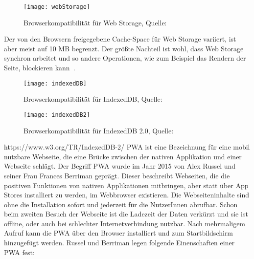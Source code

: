 \begin{figure}[H]
	\centering
	\texttt{[image: webStorage]}
	\grayRule
	\caption{Browserkompatibilität für Web Storage, Quelle: ~\cite{caniuse-ws}}
	\label{fig:webStorage}
\end{figure}
Der von den Browsern freigegebene Cache-Space für Web Storage variiert, ist aber meist auf 10 MB begrenzt. Der größte Nachteil ist wohl, dass Web Storage synchron arbeitet und so andere Operationen, wie zum Beispiel das Rendern der Seite, blockieren kann~\cite{webstorage-con}.
%
%
%
%
\begin{figure}[H]
	\centering
	\texttt{[image: indexedDB]}
	\grayRule
	\caption{Browserkompatibilität für IndexedDB, Quelle: ~\cite{caniuse-idb}}
	\label{fig:indexedDB}
\end{figure}
%
\begin{figure}[H]
	\centering
	\texttt{[image: indexedDB2]}
	\grayRule
	\caption{Browserkompatibilität für IndexedDB 2.0, Quelle: ~\cite{caniuse-idb}}
	\label{fig:indexedDB2}
\end{figure}
https://www.w3.org/TR/IndexedDB-2/
%
%
%
%
\Gls{PWA} ist eine Bezeichnung für eine mobil nutzbare Webseite, die eine Brücke zwischen der nativen
Applikation und einer Webseite schlägt.
Der Begriff \gls{PWA} wurde im Jahr 2015  von Alex Russel und seiner Frau Frances Berriman geprägt.
Dieser beschreibt Webseiten, die die positiven Funktionen von nativen Applikationen mitbringen, aber statt über App Stores installiert zu werden, im Webbrowser existieren. Die Webseiteninhalte sind ohne die Installation sofort und jederzeit für die NutzerInnen abrufbar. Schon beim zweiten Besuch der Webseite ist die Ladezeit der Daten verkürzt und sie ist offline, oder auch bei schlechter Internetverbindung nutzbar. Nach mehrmaligem Aufruf kann die \gls{PWA} über den Browser installiert und zum Startbildschirm hinzugefügt werden. Russel und Berriman legen folgende Einenschaften einer \gls{PWA} fest:
